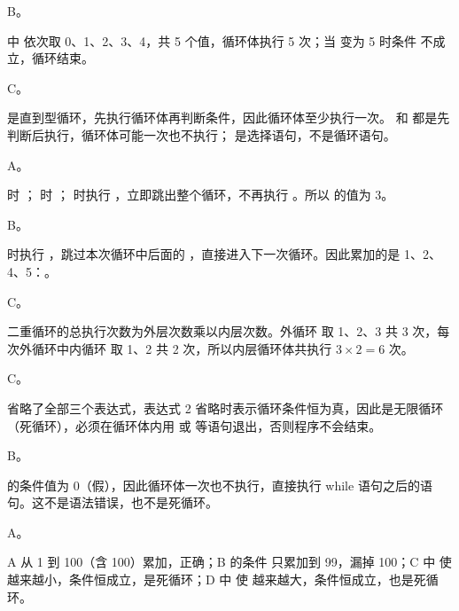 \documentclass[a4paper,11pt]{article}
\begin{document}


\q B。\begin{analysis} 中  依次取 0、1、2、3、4，共 5 个值，循环体执行 5 次；当  变为 5 时条件  不成立，循环结束。\end{analysis}

\q C。\begin{analysis} 是直到型循环，先执行循环体再判断条件，因此循环体至少执行一次。 和  都是先判断后执行，循环体可能一次也不执行； 是选择语句，不是循环语句。\end{analysis}

\q A。\begin{analysis} 时 ； 时 ； 时执行 ，立即跳出整个循环，不再执行 。所以  的值为 3。\end{analysis}

\q B。\begin{analysis} 时执行 ，跳过本次循环中后面的 ，直接进入下一次循环。因此累加的是 1、2、4、5：。\end{analysis}

\q C。\begin{analysis}二重循环的总执行次数为外层次数乘以内层次数。外循环  取 1、2、3 共 3 次，每次外循环中内循环  取 1、2 共 2 次，所以内层循环体共执行 $3\times2=6$ 次。\end{analysis}

\q C。\begin{analysis} 省略了全部三个表达式，表达式 2 省略时表示循环条件恒为真，因此是无限循环（死循环），必须在循环体内用  或  等语句退出，否则程序不会结束。\end{analysis}

\q B。\begin{analysis} 的条件值为 0（假），因此循环体一次也不执行，直接执行 while 语句之后的语句。这不是语法错误，也不是死循环。\end{analysis}

\q A。\begin{analysis}A 从 1 到 100（含 100）累加，正确；B 的条件  只累加到 99，漏掉 100；C 中  使  越来越小，条件恒成立，是死循环；D 中  使  越来越大，条件恒成立，也是死循环。\end{analysis}
\end{document}
